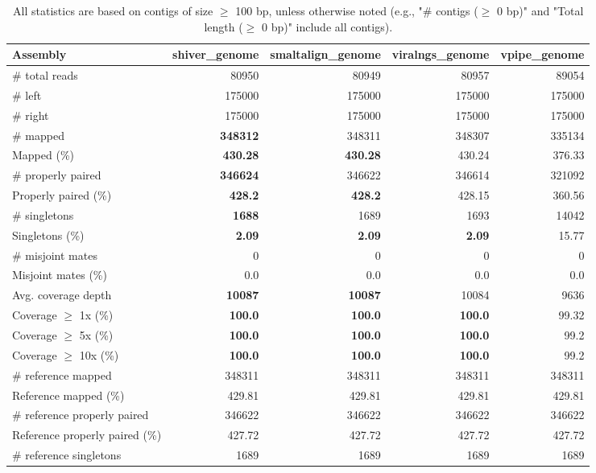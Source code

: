 \documentclass[12pt,a4paper]{article}
\begin{document}
\begin{table}[ht]
\begin{center}
\caption{All statistics are based on contigs of size $\geq$ 100 bp, unless otherwise noted (e.g., "\# contigs ($\geq$ 0 bp)" and "Total length ($\geq$ 0 bp)" include all contigs).}
\begin{tabular}{|l*{4}{|r}|}
\hline
Assembly & shiver\_genome & smaltalign\_genome & viralngs\_genome & vpipe\_genome \\ \hline
\# total reads & 80950 & 80949 & 80957 & 89054 \\ \hline
\# left & 175000 & 175000 & 175000 & 175000 \\ \hline
\# right & 175000 & 175000 & 175000 & 175000 \\ \hline
\# mapped & {\bf 348312} & 348311 & 348307 & 335134 \\ \hline
Mapped (\%) & {\bf 430.28} & {\bf 430.28} & 430.24 & 376.33 \\ \hline
\# properly paired & {\bf 346624} & 346622 & 346614 & 321092 \\ \hline
Properly paired (\%) & {\bf 428.2} & {\bf 428.2} & 428.15 & 360.56 \\ \hline
\# singletons & {\bf 1688} & 1689 & 1693 & 14042 \\ \hline
Singletons (\%) & {\bf 2.09} & {\bf 2.09} & {\bf 2.09} & 15.77 \\ \hline
\# misjoint mates & 0 & 0 & 0 & 0 \\ \hline
Misjoint mates (\%) & 0.0 & 0.0 & 0.0 & 0.0 \\ \hline
Avg. coverage depth & {\bf 10087} & {\bf 10087} & 10084 & 9636 \\ \hline
Coverage $\geq$ 1x (\%) & {\bf 100.0} & {\bf 100.0} & {\bf 100.0} & 99.32 \\ \hline
Coverage $\geq$ 5x (\%) & {\bf 100.0} & {\bf 100.0} & {\bf 100.0} & 99.2 \\ \hline
Coverage $\geq$ 10x (\%) & {\bf 100.0} & {\bf 100.0} & {\bf 100.0} & 99.2 \\ \hline
\# reference mapped & 348311 & 348311 & 348311 & 348311 \\ \hline
Reference mapped (\%) & 429.81 & 429.81 & 429.81 & 429.81 \\ \hline
\# reference properly paired & 346622 & 346622 & 346622 & 346622 \\ \hline
Reference properly paired (\%) & 427.72 & 427.72 & 427.72 & 427.72 \\ \hline
\# reference singletons & 1689 & 1689 & 1689 & 1689 \\ \hline

\end{tabular}
\end{center}
\end{table}
\end{document}

